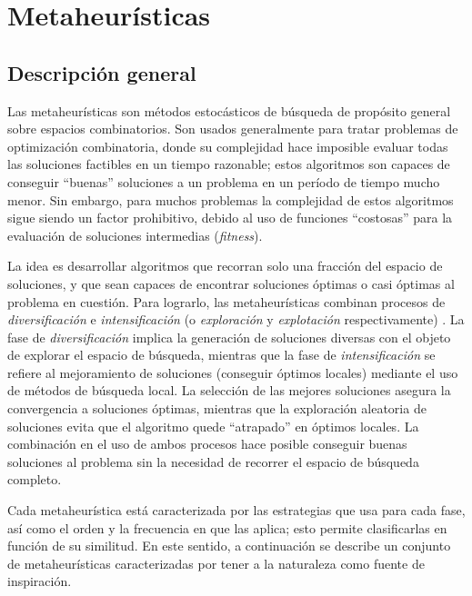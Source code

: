 \chapter{Metaheurísticas}
\label{capitulo2}

\section{Descripción general}

Las metaheurísticas son métodos estocásticos de búsqueda de propósito general sobre espacios combinatorios. Son usados generalmente para tratar problemas de optimización combinatoria, donde su complejidad hace imposible evaluar todas las soluciones factibles en un tiempo razonable; estos algoritmos son capaces de conseguir ``buenas'' soluciones a un problema en un período de tiempo mucho menor. Sin embargo, para muchos problemas la complejidad de estos algoritmos sigue siendo un factor prohibitivo, debido al uso de funciones ``costosas'' para la evaluación de soluciones intermedias (\emph{fitness}).

La idea es desarrollar algoritmos que recorran solo una fracción del espacio de soluciones, y que sean capaces de encontrar soluciones óptimas o casi óptimas al problema en cuestión. Para lograrlo, las metaheurísticas combinan procesos de \emph{diversificación} e \emph{intensificación} (o \emph{exploración} y \emph{explotación} respectivamente) \cite{Yang:2008:NMA:1628847}. La fase de \emph{diversificación} implica la generación de soluciones diversas con el objeto de explorar el espacio de búsqueda, mientras que la fase de \emph{intensificación} se refiere al mejoramiento de soluciones (conseguir óptimos locales) mediante el uso de métodos de búsqueda local. La selección de las mejores soluciones asegura la convergencia a soluciones óptimas, mientras que la exploración aleatoria de soluciones evita que el algoritmo quede ``atrapado'' en óptimos locales. La combinación en el uso de ambos procesos hace posible conseguir buenas soluciones al problema sin la necesidad de recorrer el espacio de búsqueda completo.

Cada metaheurística está caracterizada por las estrategias que usa para cada fase, así como el orden y la frecuencia en que las aplica; esto permite clasificarlas en función de su similitud. En este sentido, a continuación se describe un conjunto de metaheurísticas caracterizadas por tener a la naturaleza como fuente de inspiración.

